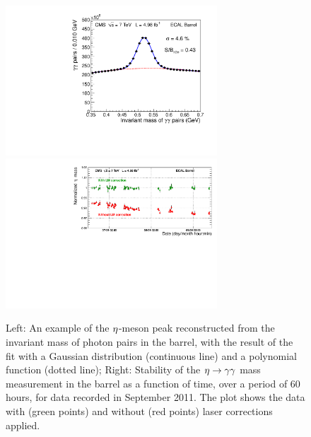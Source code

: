\begin{figure}[bht]
\begin{center}
 \includegraphics[width=0.40\linewidth,height=5.6cm]{figs/cms/eta_peak.pdf}
 \includegraphics[width=0.59\linewidth,height=5.6cm]{figs/cms/eta_zoom.pdf}
\end{center}
\caption{\label{fig:etaEB}
Left: An example of the $\eta$-meson peak reconstructed from the invariant
mass of photon pairs in the barrel, with the result of the fit with a Gaussian
distribution (continuous line) and a polynomial function (dotted line);
Right: Stability of the $\eta\to\gamma\gamma$ mass measurement in the barrel as a
function of time, over a period of 60 hours, for data recorded in
September 2011. The plot shows the data with (green points) and
without (red points) laser corrections applied.}
\end{figure}

